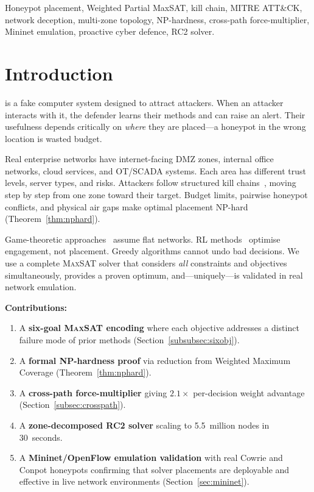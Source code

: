 \documentclass[journal]{IEEEtran}
\newcommand{\maxsat}{\textsc{MaxSAT}}
\begin{document}
\begin{IEEEkeywords}
Honeypot placement, Weighted Partial MaxSAT, kill chain,
MITRE ATT\&CK, network deception, multi-zone topology,
NP-hardness, cross-path force-multiplier, Mininet emulation,
proactive cyber defence, RC2 solver.
\end{IEEEkeywords}

\section{Introduction}
\label{sec:intro}

 is a fake computer system
designed to attract attackers.
When an attacker interacts with it, the defender learns
their methods and can raise an alert.
Their usefulness depends critically on \emph{where} they
are placed---a honeypot in the wrong location is wasted
budget.

Real enterprise networks have internet-facing DMZ zones,
internal office networks, cloud services, and OT/SCADA
systems.
Each area has different trust levels, server types, and
risks.
Attackers follow structured kill chains~\cite{hutchins2011},
moving step by step from one zone toward their target.
Budget limits, pairwise honeypot conflicts, and physical
air gaps make optimal placement NP-hard
(Theorem~\ref{thm:nphard}).

Game-theoretic approaches~\cite{kiekintveld2015,pawlick2019}
assume flat networks.
RL methods~\cite{huang2019} optimise engagement, not
placement.
Greedy algorithms cannot undo bad decisions.
We use a complete \maxsat{} solver that considers \emph{all}
constraints and objectives simultaneously, provides a proven
optimum, and---uniquely---is validated in real network
emulation.

\textbf{Contributions:}
\begin{enumerate}
\item A \textbf{six-goal \maxsat{} encoding} where each
objective addresses a distinct failure mode of prior
methods (Section~\ref{subsubsec:sixobj}).

\item A \textbf{formal NP-hardness proof} via reduction from
Weighted Maximum Coverage (Theorem~\ref{thm:nphard}).

\item A \textbf{cross-path force-multiplier} giving
$2.1\times$ per-decision weight advantage
(Section~\ref{subsec:crosspath}).

\item A \textbf{zone-decomposed RC2 solver} scaling to
5.5~million nodes in 30~seconds.

\item A \textbf{Mininet/OpenFlow emulation validation}
with real Cowrie and Conpot honeypots confirming that
solver placements are deployable and effective in live
network environments (Section~\ref{sec:mininet}).
\end{enumerate}
\end{document}
